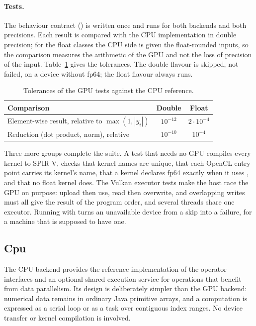 \documentclass[main.tex]{subfiles}
\begin{document}
    \paragraph{Tests.}
    The behaviour contract () is written once and runs for both backends and both precisions. Each result is compared with the CPU implementation in double precision; for the float classes the CPU side is given the float-rounded inputs, so the comparison measures the arithmetic of the GPU and not the loss of precision of the input. Table~\ref{tab:gpu-tolerances} gives the tolerances. The double flavour is skipped, not failed, on a device without fp64; the float flavour always runs.
    \begin{table}[ht]
        \centering
        \renewcommand{\arraystretch}{1.25}
        \begin{tabular}{@{}lcc@{}}
            \toprule
            Comparison & Double & Float \\
            \midrule
            Element-wise result, relative to $\max(1,|y_i|)$ & $10^{-12}$ & $2\cdot 10^{-4}$ \\
            Reduction (dot product, norm), relative & $10^{-10}$ & $10^{-4}$ \\
            \bottomrule
        \end{tabular}
        \caption{Tolerances of the GPU tests against the CPU reference.}
        \label{tab:gpu-tolerances}
    \end{table}
    Three more groups complete the suite. A test that needs no GPU compiles every kernel to SPIR-V, checks that kernel names are unique, that each OpenCL entry point carries its kernel's name, that a kernel declares fp64 exactly when it uses , and that no float kernel does. The Vulkan executor tests make the host race the GPU on purpose: upload then use, read then overwrite, and overlapping writes must all give the result of the program order, and several threads share one executor. Running with  turns an unavailable device from a skip into a failure, for a machine that is supposed to have one.

    \subsection{Cpu}

    The CPU backend provides the reference implementation of the operator interfaces and an optional shared execution service for operations that benefit from data parallelism. Its design is deliberately simpler than the GPU backend: numerical data remains in ordinary Java primitive arrays, and a computation is expressed as a serial loop or as a task over contiguous index ranges. No device transfer or kernel compilation is involved.
\end{document}
